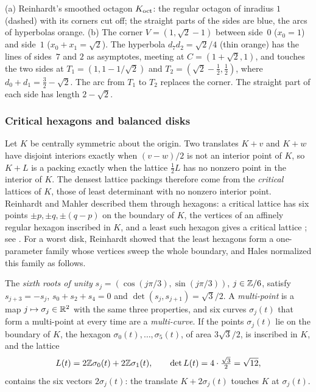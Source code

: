 (a) Reinhardt's smoothed octagon $K_{\mathrm{oct}}$: the regular octagon of inradius $1$
  (dashed) with its corners cut off; the straight parts of the sides are blue, the arcs of
  hyperbolas orange. (b) The corner $V=(1,\sqrt2-1)$ between side~$0$ ($x_0=1$) and side~$1$
  ($x_0+x_1=\sqrt2$). The hyperbola $d_7d_2=\sqrt2/4$ (thin orange) has the lines of sides~$7$ and
  $2$ as asymptotes, meeting at $C=(1+\sqrt2,1)$, and touches the two sides at
  $T_1=(1,1-1/\sqrt2)$ and $T_2=(\sqrt2-\tfrac12,\tfrac12)$, where $d_0+d_1=\tfrac32-\sqrt2$. The
  arc from $T_1$ to $T_2$ replaces the corner. The straight part of each side has length
  $2-\sqrt2$.

\subsubsection{Critical hexagons and balanced disks}\label{sec:set-balanced}

Let $K$ be centrally symmetric about the origin. Two translates $K+v$ and $K+w$ have disjoint
interiors exactly when $(v-w)/2$ is not an interior point of $K$, so $K+L$ is a packing exactly
when the lattice $\frac12L$ has no nonzero point in the interior of $K$. The densest lattice
packings therefore come from the \emph{critical} lattices of $K$, those of least determinant with
no nonzero interior point. Reinhardt and Mahler described them through hexagons: a critical lattice
has six points $\pm p,\pm q,\pm(q-p)$ on the boundary of $K$, the vertices of an affinely regular
hexagon inscribed in $K$, and a least such hexagon gives a critical lattice
\cite{Reinhardt1934,Mahler1947c}; see \cite[\S2.2]{HalesVajjha2024}. For a worst disk, Reinhardt
showed that the least hexagons form a one-parameter family whose vertices sweep the whole boundary,
and Hales normalized this family as follows.

The \emph{sixth roots of unity} $s_j=(\cos(j\pi/3),\sin(j\pi/3))$, $j\in\mathbb{Z}/6$, satisfy
$s_{j+3}=-s_j$, $s_0+s_2+s_4=0$ and $\det(s_j,s_{j+1})=\sqrt3/2$. A \emph{multi-point} is a map
$j\mapsto\sigma_j\in\mathbb{R}^2$ with the same three properties, and six curves $\sigma_j(t)$ that form a
multi-point at every time are a \emph{multi-curve}. If the points $\sigma_j(t)$ lie on the boundary
of $K$, the hexagon $\sigma_0(t),\dots,\sigma_5(t)$, of area $3\sqrt3/2$, is inscribed in $K$, and
the lattice
\[
  L(t)=2\mathbb{Z}\sigma_0(t)+2\mathbb{Z}\sigma_1(t),\qquad \det L(t)=4\cdot\tfrac{\sqrt3}{2}=\sqrt{12},
\]
contains the six vectors $2\sigma_j(t)$: the translate $K+2\sigma_j(t)$ touches $K$ at
$\sigma_j(t)$.

